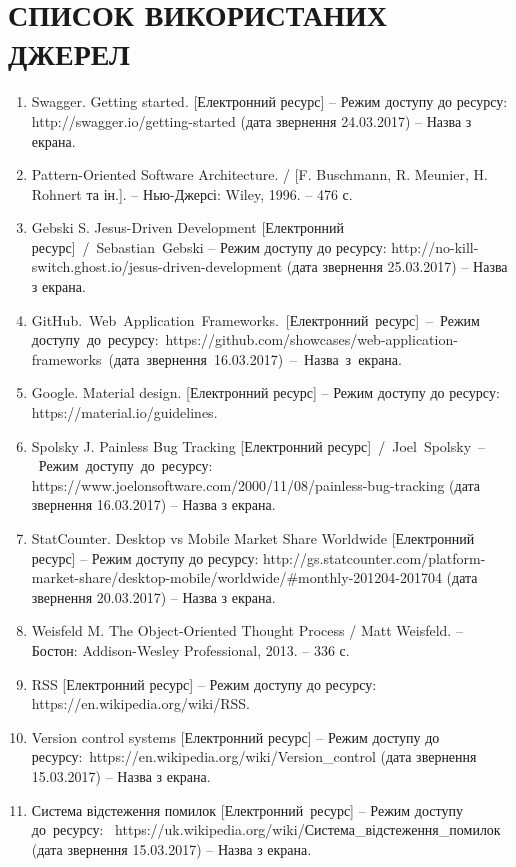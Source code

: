 \chapter*{СПИСОК ВИКОРИСТАНИХ ДЖЕРЕЛ}

\begin{enumerate}
	\item Swagger. Getting started. [Електронний ресурс] – Режим доступу до ресурсу: http://swagger.io/getting-started (дата звернення 24.03.2017) – Назва з екрана.
	\item Pattern-Oriented Software Architecture. / [F. Buschmann, R. Meunier, H. Rohnert та ін.]. – Нью-Джерсі: Wiley, 1996. – 476 с.
	\item Gebski S. Jesus-Driven Development [Електронний ресурс]~/~Sebastian~Gebski – Режим доступу до ресурсу: http://no-kill-switch.ghost.io/jesus-driven-development (дата звернення 25.03.2017) – Назва з екрана.
	\item GitHub.~Web~Application~Frameworks.~[Електронний~ресурс]~–~Режим доступу~до~ресурсу:~https://github.com/showcases/web-application-frameworks~(дата~звернення~16.03.2017)~–~Назва~з~екрана.
	\item Google. Material design. [Електронний ресурс] – Режим доступу до ресурсу: https://material.io/guidelines.
	\item Spolsky J. Painless Bug Tracking [Електронний ресурс]~/~Joel~Spolsky~–~Режим~доступу~до~ресурсу: https://www.joelonsoftware.com/2000/11/08/painless-bug-tracking (дата звернення 16.03.2017) – Назва з екрана.
	\item StatCounter. Desktop vs Mobile Market Share Worldwide [Електронний ресурс] – Режим доступу до ресурсу: http://gs.statcounter.com/platform-market-share/desktop-mobile/worldwide/\#monthly-201204-201704 (дата звернення 20.03.2017) – Назва з екрана.
	\item Weisfeld M. The Object-Oriented Thought Process / Matt Weisfeld. – Бостон: Addison-Wesley Professional, 2013. – 336 с.
	\item RSS [Електронний ресурс] – Режим доступу до ресурсу: https://en.wikipedia.org/wiki/RSS.
	\item Version control systems [Електронний ресурс] – Режим доступу до ресурсу:~https://en.wikipedia.org/wiki/Version\_control (дата звернення 15.03.2017) – Назва з екрана.
	\item Система відстеження помилок [Електронний~ресурс] – Режим доступу до~ресурсу:~ https://uk.wikipedia.org/wiki/Система\_відстеження\_помилок (дата звернення 15.03.2017) – Назва з екрана.

\end{enumerate}
